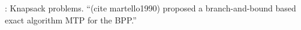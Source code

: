 \documentclass[oribibl]{llncs}
\begin{document}
\cite{martello1990b}: Knapsack problems. ``(cite martello1990) proposed a branch-and-bound based exact algorithm MTP for the BPP.'' 









%


\begin{comment}
- all citations have been changed to \cite{}, so that the citation shows up in green in latex. some of these citations need to be changed to (\citealp{}) (or \citep{}, same outcome) as the citations need to be in brackets but without the year in brackets.
- 1. "As proven by \cite{dosa2007}, ..." -> "As proven by Dosa (2007), ..."
- 2. "... FFD algorithm (\cite{eilon1971}), which ..." -> "... FFD algorithm (Eilon and Christofides (1971)), which .." NOTE THE YEAR IS IN BRACKETS INSIDE THE CITATION BRACKETS, THIS IS ONLY WHILE WRITING, THIS NEEDS TO BE CHANGED BEFORE SUBMISSION
- 3. "... FFD algorithm (\citealp{eilon1971}), which ..." -> "... FFD algorithm (Eilon and Christofides, 1971), which .." THIS IS HOW IT NEEDS TO BE WHEN SUBMITTING
\end{comment}
\end{document}
